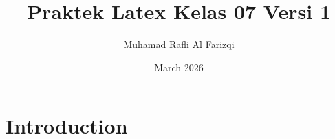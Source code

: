 \documentclass{article}
\title{Praktek Latex Kelas 07 Versi 1}
\author{Muhamad Rafli Al Farizqi}
\date{March 2026}
\begin{document}
\maketitle

\section{Introduction}
\end{document}
